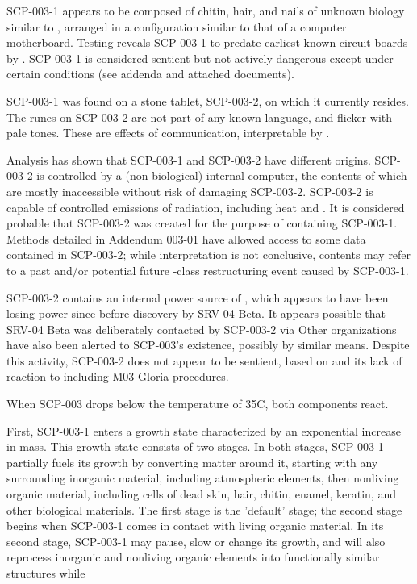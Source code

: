 SCP-003-1 appears to be composed of chitin, hair, and nails of unknown biology similar to \redacted, arranged in a configuration similar to that of a computer motherboard. Testing reveals SCP-003-1 to predate earliest known circuit boards by \redacted. SCP-003-1 is considered sentient but not actively dangerous except under certain conditions (see addenda and attached documents).

SCP-003-1 was found on a stone tablet, SCP-003-2, on which it currently resides. The runes on SCP-003-2 are not part of any known language, and flicker with pale tones. These are effects of communication, interpretable by \expunged.

Analysis has shown that SCP-003-1 and SCP-003-2 have different origins. SCP-003-2 is controlled by a (non-biological) internal computer, the contents of which are mostly inaccessible without risk of damaging SCP-003-2. SCP-003-2 is capable of controlled emissions of radiation, including heat and \redacted. It is considered probable that SCP-003-2 was created for the purpose of containing SCP-003-1. Methods detailed in Addendum 003-01 have allowed access to some data contained in SCP-003-2; while interpretation is not conclusive, contents may refer to a past and/or potential future -class restructuring event caused by SCP-003-1.

SCP-003-2 contains an internal power source of \linebreak \expunged, which appears to have been losing power since  before discovery by SRV-04 Beta. It appears possible that SRV-04 Beta was deliberately contacted by SCP-003-2 via \expunged Other organizations have also been alerted to SCP-003's existence, possibly by similar means. Despite this activity, SCP-003-2 does not appear to be sentient, based on \redacted and its lack of reaction to \redacted including M03-Gloria procedures.

When SCP-003 drops below the temperature of 35\degree C, both components react.

First, SCP-003-1 enters a growth state characterized by an exponential increase in mass. This growth state consists of two stages. In both stages, SCP-003-1 partially fuels its growth by converting matter around it, starting with any surrounding inorganic material, including atmospheric elements, then nonliving organic material, including cells of dead skin, hair, chitin, enamel, keratin, and other biological materials.
\newpage
The first stage is the 'default' stage; the second stage begins when SCP-003-1 comes in contact with living organic material. In its second stage, SCP-003-1 may pause, slow or change its growth, and will also reprocess inorganic and nonliving organic elements into functionally similar structures while \expunged

